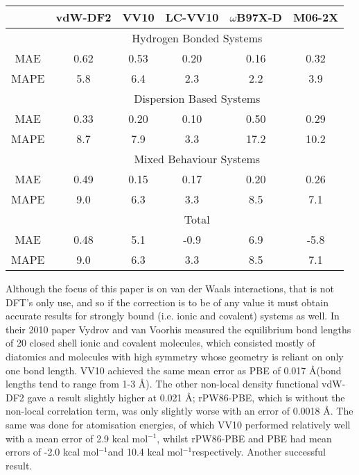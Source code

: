 \documentclass[10pt,a4paper,twocolumn,twoside]{extarticle}
\newcommand{\kcal}{kcal mol\(^{-1}\)}
\newcommand{\oA}{\si{\angstrom}}
\begin{document}
	\begin{table*}
		\centering
		\begin{tabular}[]{c|c c c c c}
			& vdW-DF2 & VV10 & LC-VV10 & $\omega$B97X-D & M06-2X\\
			\hline
			& \multicolumn{5}{c}{Hydrogen Bonded Systems}\\
			MAE & 0.62 & 0.53 & 0.20 & 0.16 & 0.32\\
			MAPE & 5.8 & 6.4 & 2.3 & 2.2 & 3.9\\
			& \multicolumn{5}{c}{Dispersion Based Systems}\\
			MAE & 0.33 & 0.20 & 0.10 & 0.50 & 0.29\\
			MAPE & 8.7 & 7.9 & 3.3 & 17.2 & 10.2\\
			& \multicolumn{5}{c}{Mixed Behaviour Systems}\\
			MAE & 0.49 & 0.15 & 0.17 & 0.20 & 0.26\\
			MAPE & 9.0 & 6.3 & 3.3 & 8.5 & 7.1\\
			& \multicolumn{5}{c}{Total}\\
			MAE & 0.48 & 5.1 & -0.9 & 6.9 & -5.8\\
			MAPE & 9.0 & 6.3 & 3.3 & 8.5 & 7.1\\
		\end{tabular}
		\caption{Errors of the binding energy at equilibrium distance for the functionals benchmarked against the S66 test set for weakly bounded systems in references\cite{Vydrov2012}, where MAE is the mean absolute error in \kcal and MAPE is the mean absolute percentage error. }
		\label{tab:VV10S66}
	\end{table*}

	Although the focus of this paper is on van der Waals interactions, that is not DFT's only use, and so if the correction is to be of any value it must obtain accurate results for strongly bound (i.e. ionic and covalent) systems as well. In their 2010 paper Vydrov and van Voorhis\cite{Vydrov2010} measured the equilibrium bond lengths\cite{physvals} of 20 closed shell ionic and covalent molecules, which consisted mostly of diatomics and molecules with high symmetry whose geometry is reliant on only one bond length. VV10 achieved the same mean error as PBE of 0.017 \oA (bond lengths tend to range from 1-3 \oA). The other non-local density functional vdW-DF2 gave a result slightly higher at 0.021 \oA; rPW86-PBE, which is without the non-local correlation term, was only slightly worse with an error of 0.0018 \oA. The same was done for atomisation energies\cite{atomisationvals}, of which VV10 performed relatively well with a mean error of 2.9 \kcal, whilst rPW86-PBE and PBE had mean errors of -2.0 \kcal and 10.4 \kcal respectively. Another successful result. 
\end{document}
